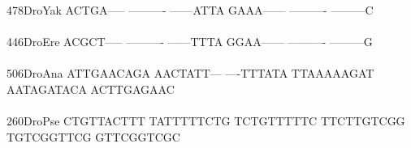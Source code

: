 \documentclass[11pt,twoside,reqno,a4paper]{article}
\begin{document}
{478\hspace*{2\charwidth}DroYak	ACTGA-----	----------	------ATTA	GAAA------	----------	---------C	\\
\hspace*{5\charwidth}\hspace*{7\charwidth}\hspace*{1\charwidth}\hspace*{1\charwidth}\hspace*{1\charwidth}\hspace*{1\charwidth}\hspace*{1\charwidth}\hspace*{1\charwidth}\\
446\hspace*{2\charwidth}DroEre	ACGCT-----	----------	------TTTA	GGAA------	----------	---------G	\\
\hspace*{5\charwidth}\hspace*{7\charwidth}\hspace*{1\charwidth}\hspace*{1\charwidth}\hspace*{1\charwidth}\hspace*{1\charwidth}\hspace*{1\charwidth}\hspace*{1\charwidth}\\
506\hspace*{2\charwidth}DroAna	ATTGAACAGA	AACTATT---	----TTTATA	TTAAAAAGAT	AATAGATACA	ACTTGAGAAC	\\
\hspace*{5\charwidth}\hspace*{7\charwidth}\hspace*{1\charwidth}\hspace*{1\charwidth}\hspace*{1\charwidth}\hspace*{1\charwidth}\hspace*{1\charwidth}\hspace*{1\charwidth}\\
260\hspace*{2\charwidth}DroPse	CTGTTACTTT	TATTTTTCTG	TCTGTTTTTC	TTCTTGTCGG	TGTCGGTTCG	GTTCGGTCGC	\\
\hspace*{5\charwidth}\hspace*{7\charwidth}\hspace*{1\charwidth}\hspace*{1\charwidth}\hspace*{1\charwidth}\hspace*{1\charwidth}\hspace*{1\charwidth}\hspace*{1\charwidth}\\
}
\end{document}

